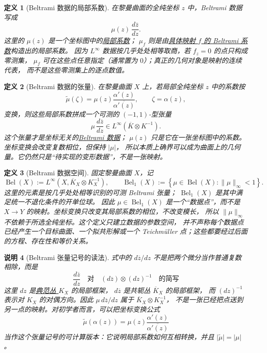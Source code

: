 \documentclass[UTF8,fontset=none,a4paper,11pt]{ctexart}
\theoremstyle{foundation-definition}
\newtheorem{definition}{定义}[section]
\theoremstyle{foundation-theorem}
\theoremstyle{foundation-proposition}
\theoremstyle{foundation-example}
\theoremstyle{foundation-remark}
\newtheorem{remark}[definition]{说明}
\theoremstyle{foundation-theorem}
\newcommand{\term}[2]{\hyperref[#1]{#2}}
\begin{document}
\begin{definition}[Beltrami 数据的局部系数]\label{def:beltrami-differential}
在黎曼曲面的全纯坐标 \(z\) 中，Beltrami 数据写成
\[
\mu(z)\,\frac{d\overline z}{dz}.
\]
这里的 \(\mu(z)\) 是一个坐标图中的\term{def:beltrami-differential}{局部系数}；
\(\mu_f\) 则是由\term{def:map-beltrami-coefficient}{具体映射 \(f\) 的 Beltrami 系数}构造出的局部系数。
因为 \(L^\infty\) 数据按几乎处处相等取商，若 \(f_z=0\) 的点只构成零测集，
\(\mu_f\) 可在这些点任意指定（通常置为 \(0\)）；真正的几何对象是映射的连续代表，
而不是这些零测集上的逐点数值。
\end{definition}

\begin{definition}[Beltrami 数据的张量]\label{def:beltrami-tensor}
在黎曼曲面 \(X\) 上，若局部全纯坐标 \(z\) 中的系数按
\[
\widetilde\mu(\zeta)
=\mu(z)\frac{\alpha'(z)}{\overline{\alpha'(z)}},
\qquad \zeta=\alpha(z),
\]
变换，则这些局部系数拼成一个可测的 \((-1,1)\)-型张量
\[
\mu\,\frac{d\overline z}{dz}\in
L^\infty(\overline K\otimes K^{-1}).
\]
这个张量才是坐标无关的\term{def:beltrami-tensor}{Beltrami 数据}；
\(\mu(z)\) 只是它在一张坐标图中的系数。坐标变换会改变复数相位，但保持 \(|\mu|\)，
所以本质上确界可以成为曲面上的几何量。它仍然只是“待实现的变形数据”，不是一张映射。
\end{definition}

\begin{definition}[Beltrami 数据空间]\label{def:beltrami-space}
固定黎曼曲面 \(X\)，记
\[
  \operatorname{Bel}(X):=
  L^\infty\!\left(X,\overline K_X\otimes K_X^{-1}\right),
  \qquad
  \operatorname{Bel}_1(X):=\left\{\mu\in\operatorname{Bel}(X):
  \|\mu\|_\infty<1\right\}.
\]
这里的元素是按几乎处处相等识别的可测 Beltrami 张量；
\(\operatorname{Bel}_1(X)\) 是其中满足统一不退化条件的开单位球。
因此 \(\mu\in\operatorname{Bel}_1(X)\) 是一个“数据点”，而不是
\(X\to Y\) 的映射。坐标变换只改变其局部系数的相位，不改变模长，
所以 \(\|\mu\|_\infty\) 不依赖于所选全纯坐标。这个定义只建立数据的参数空间，
并不声称每个数据点已经产生一个目标曲面、一个拟共形解或一个
Teichmüller 点；这些都要经过后面的方程、存在性和等价关系。
\end{definition}

\begin{remark}[Beltrami 张量记号的读法]\label{rem:beltrami-tensor-notation}
式中的
\(d\overline z/dz\) 不是把两个微分当作普通复数相除，而是
\[
\frac{d\overline z}{dz}
\quad\text{对}\quad
(d\overline z)\otimes(dz)^{-1}
\quad\text{的简写}
\]
这里 \(dz\) 是\term{def:line-bundle}{典范丛 \(K_X\)} 的局部框架，
\(d\overline z\) 是共轭丛 \(\overline K_X\) 的局部框架，
而 \((dz)^{-1}\) 表示对 \(K_X\) 的对偶方向。因此
\(\mu\,d\overline z/dz\) 属于 \(\overline K_X\otimes K_X^{-1}\)，
不是一张已经把点送到另一点的映射。对初学者而言，可以把坐标变换公式
\[
\widetilde\mu(\alpha(z))
 =\mu(z)\frac{\alpha'(z)}{\overline{\alpha'(z)}}
\]
当作这个张量记号的可计算版本：它说明局部系数如何互相转换，并且
\(\lvert\widetilde\mu\rvert=\lvert\mu\rvert\)。
\end{remark}
\end{document}
